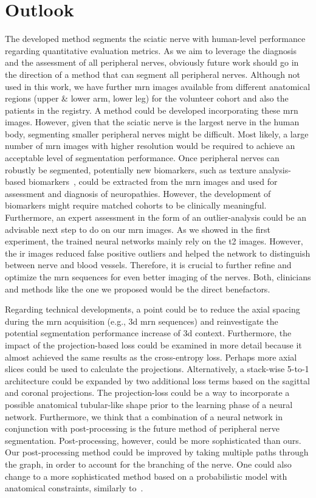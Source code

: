 \chapter{Outlook} \label{chap:outlook}
The developed method segments the sciatic nerve with human-level performance regarding quantitative evaluation metrics. As we aim to leverage the diagnosis and the assessment of all peripheral nerves, obviously future work should go in the direction of a method that can segment all peripheral nerves. Although not used in this work, we have further \gls{mrn} images available from different anatomical regions (upper \& lower arm, lower leg) for the volunteer cohort and also the patients in the registry. A method could be developed incorporating these \gls{mrn} images. However, given that the sciatic nerve is the largest nerve in the human body, segmenting smaller peripheral nerves might be difficult. Most likely, a large number of \gls{mrn} images with higher resolution would be required to achieve an acceptable level of segmentation performance. Once peripheral nerves can robustly be segmented, potentially new biomarkers, such as texture analysis-based biomarkers~\cite{FelisazTextureNeuropathy}, could be extracted from the \gls{mrn} images and used for assessment and diagnosis of neuropathies. However, the development of biomarkers might require matched cohorts to be clinically meaningful. Furthermore, an expert assessment in the form of an outlier-analysis could be an advisable next step to do on our \gls{mrn} images. As we showed in the first experiment, the trained neural networks mainly rely on the \gls{t2} images. However, the \gls{ir} images reduced false positive outliers and helped the network to distinguish between nerve and blood vessels. Therefore, it is crucial to further refine and optimize the \gls{mrn} sequences for even better imaging of the nerves. Both, clinicians and methods like the one we proposed would be the direct benefactors.

Regarding technical developments, a point could be to reduce the axial spacing during the \gls{mrn} acquisition (e.g., \gls{3d} \gls{mrn} sequences) and reinvestigate the potential segmentation performance increase of \gls{3d} context.
Furthermore, the impact of the projection-based loss could be examined in more detail because it almost achieved the same results as the cross-entropy loss. Perhaps more axial slices could be used to calculate the projections. Alternatively, a stack-wise 5-to-1 architecture could be expanded by two additional loss terms based on the sagittal and coronal projections. The projection-loss could be a way to incorporate a possible anatomical tubular-like shape prior to the learning phase of a neural network. Furthermore, we think that a combination of a neural network in conjunction with post-processing is the future method of peripheral nerve segmentation. Post-processing, however, could be more sophisticated than ours. Our post-processing method could be improved by taking multiple paths through the graph, in order to account for the branching of the nerve. One could also change to a more sophisticated method based on a probabilistic model with anatomical constraints, similarly to~\cite{Rempfler2015ReconstructingProgramming}.
\endinput